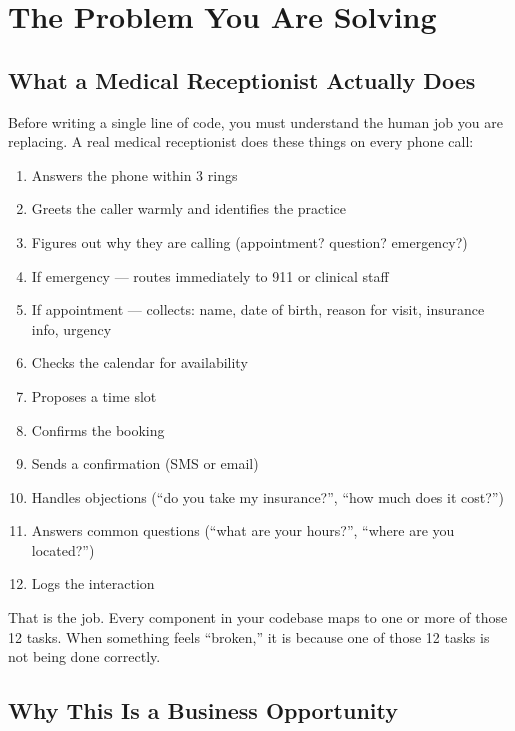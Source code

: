 \documentclass[12pt, a4paper]{report}
\begin{document}
\chapter{The Problem You Are Solving}

\section{What a Medical Receptionist Actually Does}

Before writing a single line of code, you must understand the human job you are
replacing. A real medical receptionist does these things on every phone call:

\begin{enumerate}
  \item Answers the phone within 3 rings
  \item Greets the caller warmly and identifies the practice
  \item Figures out why they are calling (appointment? question? emergency?)
  \item If emergency --- routes immediately to 911 or clinical staff
  \item If appointment --- collects: name, date of birth, reason for visit, insurance info, urgency
  \item Checks the calendar for availability
  \item Proposes a time slot
  \item Confirms the booking
  \item Sends a confirmation (SMS or email)
  \item Handles objections (``do you take my insurance?'', ``how much does it cost?'')
  \item Answers common questions (``what are your hours?'', ``where are you located?'')
  \item Logs the interaction
\end{enumerate}

That is the job. Every component in your codebase maps to one or more of those 12 tasks.
When something feels ``broken,'' it is because one of those 12 tasks is not being done
correctly.

\section{Why This Is a Business Opportunity}
\end{document}
